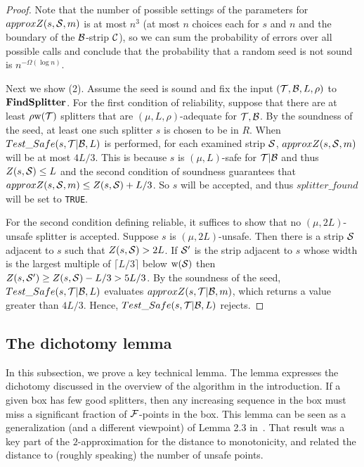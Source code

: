 \documentclass{acmsmall}
\newcommand{\cB}{{\cal B}}
\newcommand{\cC}{{\cal C}}
\newcommand{\cF}{{\cal F}}
\newcommand{\cS}{{\cal S}}
\newcommand{\cT}{{\cal T}}
\newcommand{\Prop}[1]{\hyperref[prop:#1]{Prop.~\ref*{prop:#1}}} %
\newcommand{\strip}[2]{#1|#2}
\newcommand{\width}{{\bf {\rm  w}}}
\newcommand{\findsplitter}{{\rm {\bf FindSplitter}}}
\newcommand{\splitterfound}{splitter\_found}
\begin{document}
\begin{proof}
Note that the number of possible settings of the parameters for $approxZ(s,\cS,m)$ is at most $n^3$ (at most $n$ choices each for $s$ and $n$
and the boundary of the $\cB$-strip $\cC$), so we can sum the probability of errors over all possible calls and conclude that
the probability that a random seed is not sound is $n^{-\Omega(\log n)}$.

%
%


Next we show (2).  Assume the seed is sound and fix the input $(\cT,\cB,L,\rho)$ to $\findsplitter$.  For the first condition of reliability,
 suppose that there  are at least $\rho \width(\cT)$
splitters that are $(\mu,L,\rho)$-adequate for $\cT,\cB$.  By the soundness of the seed, at least one such splitter $s$ is chosen to be in $R$. 
 When $Test\_Safe(s,\strip{\cT}{\cB},L)$  is performed, 
for each examined strip $\cS$, $approxZ(s,\cS,m)$ will be at most $4L/3$.  This is because $s$ is $(\mu,L)$-safe for $\strip{\cT}{\cB}$
and thus $Z(s,\cS) \leq L$ and the second condition of soundness guarantees that $approxZ(s,\cS,m) \leq Z(s,\cS)+L/3$.
So $s$ will be accepted, and thus $\splitterfound$ will be set to {\tt TRUE}. 

For the second condition defining reliable, it suffices to show that
no $(\mu,2L)$-unsafe splitter is accepted.  Suppose $s$ is $(\mu,2L)$-unsafe.  Then there is a strip $\cS$ adjacent to $s$ such that $Z(s,\cS) > 2L$.  If $\cS'$
is the strip adjacent to $s$ whose width is the largest multiple of $\lceil L/3 \rceil$ below $\width(\cS)$
then $Z(s,\cS') \geq Z(s,\cS)-L/3 > 5L/3$. By the soundness of the seed, $Test\_Safe(s,\strip{\cT}{\cB},L)$ evaluates
$approxZ(s,\strip{\cT}{\cB},m)$, which returns a value greater than $4L/3$. Hence, $Test\_Safe(s,\strip{\cT}{\cB},L)$ rejects.

\end{proof}




\subsection{The dichotomy lemma}
\label{subsec:dichotomy}


In this subsection, we prove a key technical lemma. The lemma expresses the 
dichotomy discussed in the overview of the algorithm in the introduction.
If a given box has few good splitters, then any increasing sequence in the box must
miss a significant fraction of $\cF$-points in the box. This lemma can be seen as a generalization
(and a different viewpoint) of Lemma 2.3 in~\cite{ACCL1}. That result was a key part
of the $2$-approximation for the distance to monotonicity, and related the distance to
(roughly speaking) the number of unsafe points.
\end{document}
